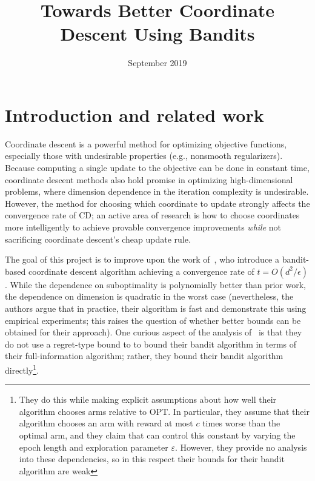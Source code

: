\documentclass[letterpaper]{article}
\title{Towards Better Coordinate Descent Using Bandits}
\date{September 2019}
\begin{document}
\maketitle


\section{Introduction and related work}

Coordinate descent is a powerful method for optimizing objective functions, especially those with undesirable properties (e.g., nonsmooth regularizers). Because computing a single update to the objective can be done in constant time, coordinate descent methods also hold promise in optimizing high-dimensional problems, where dimension dependence in the iteration complexity is undesirable. However, the method for choosing which coordinate to update strongly affects the convergence rate of CD; an active area of research is how to choose coordinates more intelligently to achieve provable convergence improvements \emph{while} not sacrificing coordinate descent's cheap update rule.

The goal of this project is to improve upon the work of~\cite{salehi2018coordinate}, who introduce a bandit-based coordinate descent algorithm achieving a convergence rate of $t = O(d^2/\epsilon)$. While the dependence on suboptimality is polynomially better than prior work, the dependence on dimension is quadratic in the worst case (nevertheless, the authors argue that in practice, their algorithm is fast and demonstrate this using empirical experiments; this raises the question of whether better bounds can be obtained for their approach). One curious aspect of the analysis of~\cite{salehi2018coordinate} is that they do not use a regret-type bound to to bound their bandit algorithm in terms of their full-information algorithm; rather, they bound their bandit algorithm directly\footnote{They do this while making explicit assumptions about how well their algorithm chooses arms relative to OPT. In particular, they assume that their algorithm chooses an arm with reward at most $c$ times worse than the optimal arm, and they claim that can control this constant by varying the epoch length and exploration parameter $\varepsilon$. However, they provide no analysis into these dependencies, so in this respect their bounds for their bandit algorithm are weak}.
\end{document}
